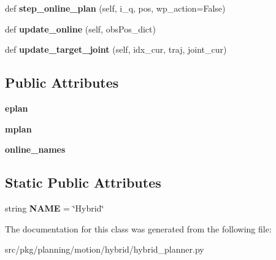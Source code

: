 \begin{DoxyCompactItemize}
def {\bfseries step\+\_\+online\+\_\+plan} (self, i\+\_\+q, pos, wp\+\_\+action=False)
\item 
\mbox{\label{classrnb-planning_1_1src_1_1pkg_1_1planning_1_1motion_1_1hybrid_1_1hybrid__planner_1_1_hybrid_planner_a3c4f8671239c342ef068dfd1fb5f63cb}} 
def {\bfseries update\+\_\+online} (self, obs\+Pos\+\_\+dict)
\item 
\mbox{\label{classrnb-planning_1_1src_1_1pkg_1_1planning_1_1motion_1_1hybrid_1_1hybrid__planner_1_1_hybrid_planner_af65e08bc49c48aed46ddac0112783662}} 
def {\bfseries update\+\_\+target\+\_\+joint} (self, idx\+\_\+cur, traj, joint\+\_\+cur)
\end{DoxyCompactItemize}
\subsection*{Public Attributes}
\begin{DoxyCompactItemize}
\item 
\mbox{\label{classrnb-planning_1_1src_1_1pkg_1_1planning_1_1motion_1_1hybrid_1_1hybrid__planner_1_1_hybrid_planner_a0c029fe949a0aae192eecc432fc1288e}} 
{\bfseries eplan}
\item 
\mbox{\label{classrnb-planning_1_1src_1_1pkg_1_1planning_1_1motion_1_1hybrid_1_1hybrid__planner_1_1_hybrid_planner_a726f858cee8921a085aace2f8528f7cd}} 
{\bfseries mplan}
\item 
\mbox{\label{classrnb-planning_1_1src_1_1pkg_1_1planning_1_1motion_1_1hybrid_1_1hybrid__planner_1_1_hybrid_planner_a5e93c4479b9b4584e30dd1dcd04dcebb}} 
{\bfseries online\+\_\+names}
\end{DoxyCompactItemize}
\subsection*{Static Public Attributes}
\begin{DoxyCompactItemize}
\item 
\mbox{\label{classrnb-planning_1_1src_1_1pkg_1_1planning_1_1motion_1_1hybrid_1_1hybrid__planner_1_1_hybrid_planner_a17cbc3e1eca48e3eb17cbf5a2540c1d9}} 
string {\bfseries N\+A\+ME} = \char`\"{}Hybrid\char`\"{}
\end{DoxyCompactItemize}


The documentation for this class was generated from the following file\+:\begin{DoxyCompactItemize}
\item 
src/pkg/planning/motion/hybrid/hybrid\+\_\+planner.\+py\end{DoxyCompactItemize}
